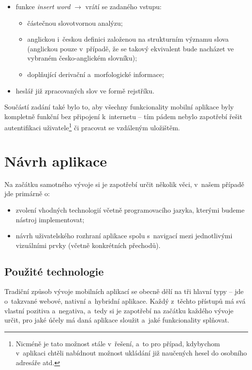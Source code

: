 \begin{itemize}
\tightlist
\item
  funkce \emph{insert word} $\rightarrow$ vrátí se zadaného vstupu:

  \begin{itemize}
  \tightlist
  \item
    částečnou slovotvornou analýzu;
  \item
    anglickou i~českou definici založenou na strukturním významu slova
    (anglickou pouze v~případě, že se takový ekvivalent bude nacházet ve
    vybraném česko-anglickém slovníku);
  \item
    doplňující derivační a~morfologické informace;
  \end{itemize}
\item
  heslář již zpracovaných slov ve formě rejstříku.
\end{itemize}

Součástí zadání také bylo to, aby všechny funkcionality mobilní aplikace
byly kompletně funkční bez připojení k~internetu -- tím pádem nebylo
zapotřebí řešit autentifikaci
uživatele\footnote{Nicméně je tato možnost stále v~řešení, a~to pro případ, kdybychom v~aplikaci chtěli nabídnout možnost ukládání již naučených hesel do osobního adresáře atd.}
či pracovat se vzdáleným uložištěm.

\hypertarget{nuxe1vrh-aplikace}{%
\section{Návrh aplikace}\label{nuxe1vrh-aplikace}}

Na začátku samotného vývoje si je zapotřebí určit několik věci, v~našem
případě jde primárně o:

\begin{itemize}
\tightlist
\item
  zvolení vhodných technologií včetně programovacího jazyka, kterými
  budeme nástroj implementovat;
\item
  návrh uživatelského rozhraní aplikace spolu s~navigací mezi
  jednotlivými vizuálními prvky (včetně konkrétních přechodů).
\end{itemize}

\hypertarget{pouux17eituxe9-technologie}{%
\subsection{Použité technologie}\label{pouux17eituxe9-technologie}}

Tradiční způsob vývoje mobilních aplikací se obecně dělí na tři hlavní
typy -- jde o~takzvané webové, nativní a~hybridní aplikace. Každý
z~těchto přístupů má svá vlastní pozitiva a~negativa, a~tedy si je
zapotřebí na začátku každého vývoje určit, pro jaké účely má daná
aplikace sloužit a~jaké funkcionality splňovat.

